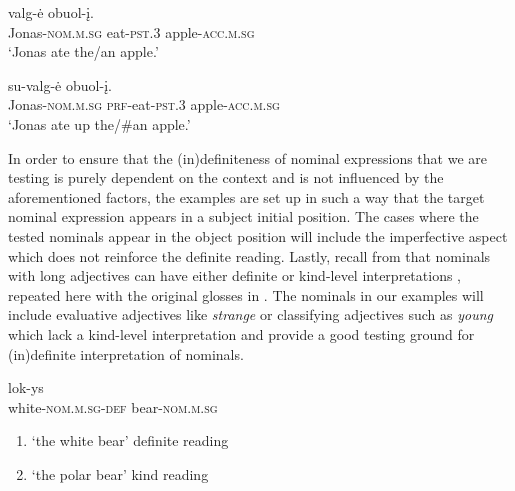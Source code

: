 \documentclass[output=paper,
modfonts
]{langscibook}
\begin{document}
\begin{exe}
\ex \label{ex:sereikaite:30}
\begin{xlist}
	\ex \label{ex:sereikaite:30a}
	 {valg-ė} {obuol-į}.\\
	Jonas-\textsc{nom.m.sg} eat-\textsc{pst.3} apple-\textsc{acc.m.sg}\\
	\trans `Jonas ate the/an apple.' \citep[75]{GillonArmoskaite2015}
	
	\ex \label{ex:sereikaite:30b}
	 {su-valg-ė} {obuol-į}.\\
	Jonas-\textsc{nom.m.sg} \textsc{prf}-eat-\textsc{pst.3} apple-\textsc{acc.m.sg}\\
	\trans `Jonas ate up the/\#an apple.' \citep[76]{GillonArmoskaite2015}
\end{xlist}
\end{exe}

In order to ensure that the (in)definiteness of nominal expressions that we are testing is purely dependent on the context and is not influenced by the aforementioned factors, the examples are set up in such a way that the target nominal expression appears in a subject initial position. The cases where the tested nominals appear in the object position will include the imperfective aspect which does not reinforce the definite reading.
Lastly, recall from  that nominals with long adjectives can have either definite or kind-level interpretations , repeated here with the original glosses in . The nominals in our examples will include evaluative adjectives like \textit{strange} or classifying adjectives such as \textit{young} which lack a kind-level interpretation and provide a good testing ground for (in)definite interpretation of nominals.\largerpage[-2]


\begin{exe} 
\ex \label{ex:sereikaite:31}
 {lok-ys} \\
white-\textsc{nom.m.sg}-{\textsc{def}} bear-\textsc{nom.m.sg}  \\
\trans 
\begin{enumerate}[label=(\roman*)]
	\item `the white bear' \checkmark definite reading  
	\item `the polar bear' \checkmark kind reading  
\end{enumerate}
\end{exe}
\end{document}
